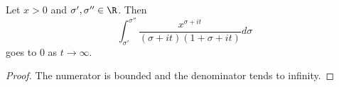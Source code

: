 \begin{lemma}
\label{Perron.tendsto_zero_Upper}
\leanok
Let $x>0$ and $\sigma',\sigma''\in\R$. Then
  $$\int_{\sigma'}^{\sigma''}\frac{x^{\sigma+it}}{(\sigma+it)(1+\sigma + it)}d\sigma$$
  goes to $0$ as $t\to\infty$.
\end{lemma}
\begin{proof}
\leanok
The numerator is bounded and the denominator tends to infinity.
\end{proof}
